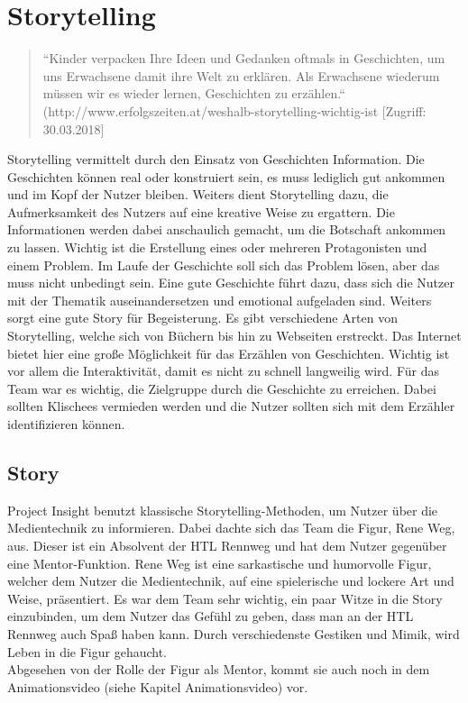 \section{Storytelling} 
\begin{quote}
“Kinder verpacken Ihre Ideen und Gedanken oftmals in Geschichten, um uns Erwachsene damit ihre Welt zu erklären. Als Erwachsene wiederum müssen wir es wieder lernen, Geschichten zu erzählen.“ (http://www.erfolgszeiten.at/weshalb-storytelling-wichtig-ist [Zugriff: 30.03.2018]
\end{quote}
Storytelling vermittelt durch den Einsatz von Geschichten Information. Die Geschichten können real oder konstruiert sein, es muss lediglich gut ankommen und im Kopf der Nutzer bleiben. Weiters dient Storytelling dazu, die Aufmerksamkeit des Nutzers auf eine kreative Weise zu ergattern. Die Informationen werden dabei anschaulich gemacht, um die Botschaft ankommen zu lassen. Wichtig ist die Erstellung eines oder mehreren Protagonisten und einem Problem. Im Laufe der Geschichte soll sich das Problem lösen, aber das muss nicht unbedingt sein. Eine gute Geschichte führt dazu, dass sich die Nutzer mit der Thematik auseinandersetzen und emotional aufgeladen sind. Weiters sorgt eine gute Story für Begeisterung. Es gibt verschiedene Arten von Storytelling, welche sich von Büchern bis hin zu Webseiten erstreckt. Das Internet bietet hier eine große Möglichkeit für das Erzählen von Geschichten. Wichtig ist vor allem die Interaktivität, damit es nicht zu schnell langweilig wird.  Für das Team war es wichtig, die Zielgruppe durch die Geschichte zu erreichen. Dabei sollten Klischees vermieden werden und die Nutzer sollten sich mit dem Erzähler identifizieren können. \cite{storytelling}
\subsection{Story}
Project Insight benutzt klassische Storytelling-Methoden, um Nutzer über die Medientechnik zu informieren. Dabei dachte sich das Team die Figur, Rene Weg, aus. Dieser ist ein Absolvent der HTL Rennweg und hat dem Nutzer gegenüber eine Mentor-Funktion. Rene Weg ist eine sarkastische und humorvolle Figur, welcher dem Nutzer die Medientechnik, auf eine spielerische und lockere Art und Weise, präsentiert. Es war dem Team sehr wichtig, ein paar Witze in die Story einzubinden, um dem Nutzer das Gefühl zu geben, dass man an der HTL Rennweg auch Spaß haben kann. Durch verschiedenste Gestiken und Mimik, wird Leben in die Figur gehaucht. \leavevmode \\
Abgesehen von der Rolle der Figur als Mentor, kommt sie auch noch in dem Animationsvideo (siehe Kapitel Animationsvideo) vor. 

